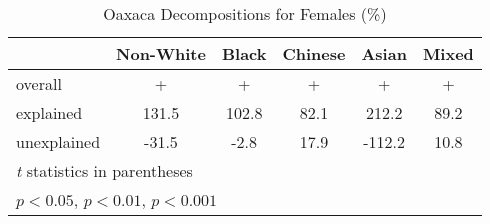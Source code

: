 \begin{table}[htbp]\centering
\caption{Oaxaca Decompositions for Females (\%)}
\begin{tabular}{l*{5}{c}}
\hline\hline
          &Non-White&    Black&  Chinese&    Asian&    Mixed\\
\hline
overall   &     +    &    +     &   +      &     +    &     +    \\
explained &    131.5\sym{***}&    102.8\sym{***}&     82.1\sym{***}&    212.2\sym{***}&     89.2\sym{***}\\
unexplained&    -31.5\sym{***}&     -2.8&     17.9&   -112.2\sym{***}&     10.8\\
\hline\hline
\multicolumn{6}{l}{\footnotesize \textit{t} statistics in parentheses}\\
\multicolumn{6}{l}{\footnotesize \sym{*} \(p<0.05\), \sym{**} \(p<0.01\), \sym{***} \(p<0.001\)}\\
\end{tabular}
\label{tab:oaxaca_pct_female}
\end{table}
